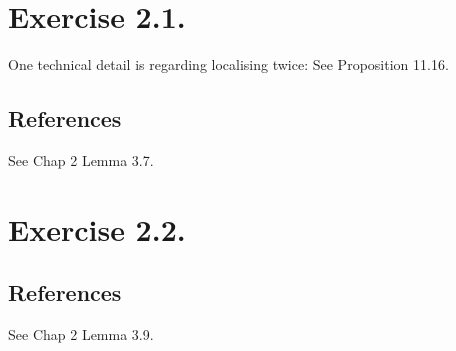 \section{Exercise 2.1.}\label{Hart Ex 2.1.}

One technical detail is regarding localising twice: See \cite{altman2013term} Proposition 11.16.

\subsection{References}

See \cite{qing2006algebraic} Chap 2 Lemma 3.7. 

\section{Exercise 2.2.}

\subsection{References}

See \cite{qing2006algebraic} Chap 2 Lemma 3.9.